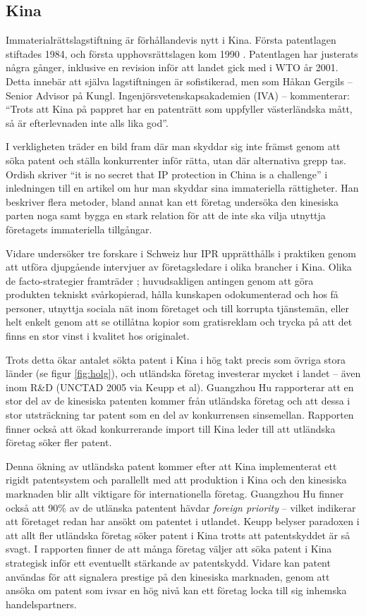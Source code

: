 
\subsection{Kina}

Immaterialrättslagstiftning är förhållandevis nytt i Kina. Första patentlagen stiftades 1984, och första upphovsrättslagen kom 1990 \cite{gergils}. Patentlagen har justerats några gånger, inklusive en revision inför att landet gick med i WTO år 2001. Detta innebär att själva lagstiftningen är sofistikerad, men som Håkan Gergils -- Senior Advisor på Kungl. Ingenjörsvetenskapsakademien (IVA) -- kommenterar: ``Trots att Kina på pappret har en patenträtt som uppfyller västerländska mått, så är 
efterlevnaden inte alls lika god''.

I verkligheten träder en bild fram där man skyddar sig inte främst genom att söka patent och ställa konkurrenter inför rätta, utan där alternativa grepp tas. Ordish skriver ``it is no secret that IP protection in China is a challenge'' \cite{ordish} i inledningen till en artikel om hur man skyddar sina immateriella rättigheter. Han beskriver flera metoder, bland annat kan ett företag undersöka den kinesiska parten noga samt bygga en stark relation för att de inte ska vilja utnyttja företagets immateriella tillgångar.

Vidare undersöker tre forskare i Schweiz hur IPR upprätthålls i praktiken genom att utföra djupgående intervjuer av företagsledare i olika brancher i Kina. Olika de facto-strategier framträder \cite{keupp}; huvudsakligen antingen genom att göra produkten tekniskt svårkopierad, hålla kunskapen odokumenterad och hos få personer, utnyttja sociala nät inom företaget och till korrupta tjänstemän, eller helt enkelt genom att se otillåtna kopior som gratisreklam och trycka på att det finns en stor vinst i kvalitet hos originalet.

Trots detta ökar antalet sökta patent i Kina i hög takt precis som övriga stora länder (se figur \ref{fig:holg}), och utländska företag investerar mycket i landet -- även inom R\&D (UNCTAD 2005 via Keupp et al). Guangzhou Hu rapporterar att en stor del av de kinesiska patenten kommer från utländska företag och att dessa i stor utsträckning tar patent som en del av konkurrensen sinsemellan\cite{hu}. Rapporten finner också att ökad konkurrerande import till Kina leder till att utländska företag söker fler patent.

Denna ökning av utländska patent kommer efter att Kina implementerat ett rigidt patentsystem och parallellt med att produktion i Kina och den kinesiska marknaden blir allt viktigare för internationella företag. Guangzhou Hu finner också att 90\% av de utlänska patentent hävdar \emph{foreign priority} -- vilket indikerar att företaget redan har ansökt om patentet i utlandet\cite{hu}. Keupp belyser paradoxen i att allt fler utländska företag söker patent i Kina trotts att patentskyddet är så svagt\cite{keupp2}. I rapporten finner de att många företag väljer att söka patent i Kina strategisk inför ett eventuellt stärkande av patentskydd\cite{keupp2}. Vidare kan patent användas för att signalera prestige på den kinesiska marknaden, genom att ansöka om patent som ivsar en hög nivå kan ett företag locka till sig inhemska handelspartners\cite{keupp2}.
